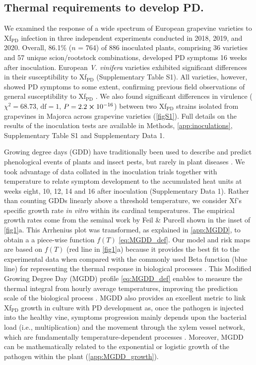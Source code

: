 \subsection{Thermal requirements to develop PD.} We examined the response of a
wide spectrum of European grapevine varieties to Xf$_{\textrm{PD}}$ infection
in three independent experiments conducted in 2018, 2019, and 2020. Overall,
86.1\% ($n$ = 764) of 886 inoculated plants, comprising 36 varieties and 57
unique scion/rootstock combinations, developed PD symptoms 16 weeks after
inoculation. European \textit{V. vinifera} varieties exhibited significant
differences in their susceptibility to Xf$_{\textrm{PD}}$ (Supplementary Table
S1). All varieties, however, showed PD symptoms to some extent, confirming
previous field observations of general susceptibility to Xf$_{\textrm{PD}}$
\cite{Hopkins2002, Moralejo2019, Purcell2013}.	We also found significant
differences in virulence ($\chi^2=68.73$, $\textrm{df}=1$, $P=2.2 \cross
    10^{-16}$) between two Xf$_{\textrm{PD}}$ strains isolated from grapevines
in
Majorca across grapevine varieties (\cref{figS1}). Full details on the
results of the inoculation tests are available in Methods,
\cref{app:inoculations}, Supplementary Table S1 and Supplementary Data 1.

Growing degree days (GDD) have traditionally been used to describe and predict
phenological events of plants and insect pests, but rarely in plant diseases
\cite{McMaster1997}. We took advantage of data collated in the inoculation
trials together with temperature to relate symptom development to the
accumulated heat units at weeks eight, 10, 12, 14 and 16 after inoculation
(Supplementary Data 1).  Rather than counting GDDs linearly above a threshold
temperature, we consider Xf's specific growth rate \textit{in vitro} within its
cardinal temperatures. The empirical growth rates come from the seminal work by
Feil \& Purcell \cite{Feil2001} shown in the inset of \cref{fig1}a. This
Arrhenius plot was transformed, as explained in \cref{app:MGDD}, to
obtain a a piece-wise function $f(T)$
\cref{eq:MGDD_def}. Our model and risk maps are based on $f(T)$ (red line in
\cref{fig1}a) because it provides the best fit to the experimental data when
compared with the commonly used Beta function (blue line) for representing the
thermal response in biological processes \cite{Yan1999,Magarey2005}. This
Modified Growing Degree Day (MGDD) profile \cref{eq:MGDD_def} enables to
measure the thermal integral from hourly average temperatures, improving the
prediction scale of the biological process \cite{butikofer2020problem}. MGDD
also provides an excellent metric to link Xf$_{\textrm{PD}}$ growth in culture
with PD development as, once the pathogen is injected into the healthy vine,
symptoms progression mainly depends upon the bacterial load (i.e.,
multiplication) and the movement through the xylem vessel network, which are
fundamentally temperature-dependent processes
\cite{fry1990multiplication,Feil2001}. Moreover, MGDD can be mathematically
related to the exponential or logistic growth of the pathogen within the plant
(\cref{app:MGDD_growth}).

